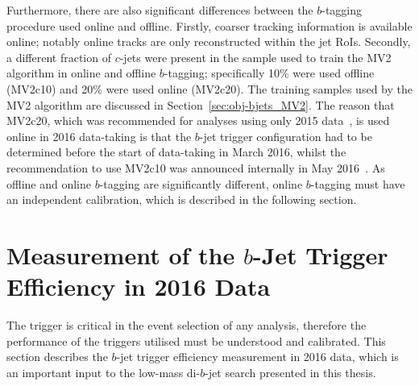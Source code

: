 Furthermore, there are also significant differences between the $b$-tagging procedure used online and offline.
Firstly, coarser tracking information is available online; notably online tracks are only reconstructed within the jet RoIs.
Secondly, a different fraction of $c$-jets were present in the sample used to train the MV2 algorithm in online and offline $b$-tagging;
specifically 10\% were used offline (MV2c10) and 20\% were used online (MV2c20).
The training samples used by the MV2 algorithm are discussed in Section~\ref{sec:obj-bjets_MV2}.
The reason that MV2c20, which was recommended for analyses using only 2015 data~\cite{obj-bjets_algo_2015}, is used online in 2016 data-taking is that the $b$-jet trigger configuration
had to be determined before the start of data-taking in March 2016,
whilst the recommendation to use MV2c10 was announced internally in May 2016~\cite{obj-bjets_algo_2016}.
As offline and online $b$-tagging are significantly different, online $b$-tagging must have an independent calibration, which is described in the following section.

\vspace{-1em}
\section{ Measurement of the $b$-Jet Trigger Efficiency in 2016 Data}
\label{sec:trig-bjet_eff}

The trigger is critical in the event selection of any analysis,
therefore the performance of the triggers utilised must be understood and calibrated.
This section describes the \mbox{$b$-jet} trigger efficiency measurement in 2016 data,
which is an important input to the low-mass di-$b$-jet search presented in this thesis.


